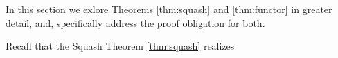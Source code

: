 In this section we exlore Theorems \ref{thm:squash} and \ref{thm:functor} in greater detail, and, specifically address the proof obligation for both.

Recall that the Squash Theorem \ref{thm:squash} realizes 
